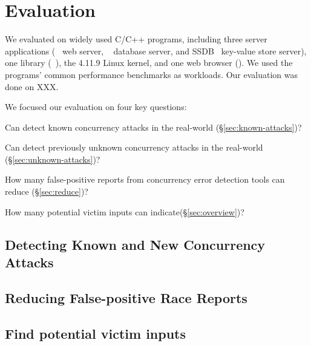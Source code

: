 \section{Evaluation}\label{sec:evaluation}

We evaluated \xxx on \nreproducedProgs widely used C/C++ programs, including 
three server applications (\apache~\cite{apache} web server, 
\mysql~\cite{mysql} database server, and SSDB~\cite{SSDB} 
key-value store server), one library (\libsafe~\cite{libsafe}), the 4.11.9 Linux 
kernel, and one web browser (\chrome). We used the programs' common performance 
benchmarks as workloads. Our evaluation was done on XXX. 


We focused our evaluation on four key questions:
\begin{tightenum}
	
		
	\item Can \xxx detect known concurrency attacks in the real-world
	(\S\ref{sec:known-attacks})?
	
	\item Can \xxx detect previously unknown concurrency attacks in the real-world
	(\S\ref{sec:unknown-attacks})?
	\item How many false-positive reports from concurrency error 
	detection tools can \xxx reduce (\S\ref{sec:reduce})?
	
	\item How many potential victim inputs can \xxx indicate(\S\ref{sec:overview})?
		
	
\end{tightenum}

\subsection{Detecting Known and New Concurrency Attacks}


\subsection{Reducing False-positive Race Reports}



\subsection{Find potential victim inputs}


